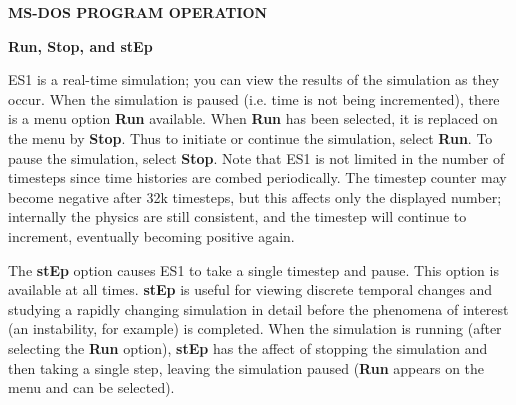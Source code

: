 \newpage
\begin{section}
{\bf MS-DOS PROGRAM OPERATION}


\begin{subsection}
{\bf Run, Stop, and stEp}

   ES1 is a real-time simulation; you can view the results of the simulation as
   they occur.  When the simulation is paused (i.e. time is not being
   incremented), there is a menu option {\bf Run} available.  When
   {\bf Run} has been
   selected, it is replaced on the menu by {\bf Stop}.  Thus to 
   initiate or continue
   the simulation, select {\bf Run}.  To pause the simulation, 
   select {\bf Stop}.  Note
   that ES1 is not limited in the number of timesteps since time histories are
   combed periodically.  The timestep counter may become negative after 32k
   timesteps, but this affects only the displayed number; internally the
   physics are still consistent, and the timestep will continue to increment,
   eventually becoming positive again.
\vspace{.2in}

\noindent
   The {\bf stEp} option causes ES1 to take a single timestep and 
   pause.  This option
   is available at all times.  {\bf stEp} is useful for viewing 
   discrete temporal
   changes and studying a rapidly changing simulation in detail before the
   phenomena of interest (an instability, for example) is completed.  When the
   simulation is running (after selecting the {\bf Run} option), 
   {\bf stEp} has the affect
   of stopping the simulation and then taking a single step, leaving the
   simulation paused ({\bf Run} appears on the menu and can be selected).
\end{subsection}


\end{section}
